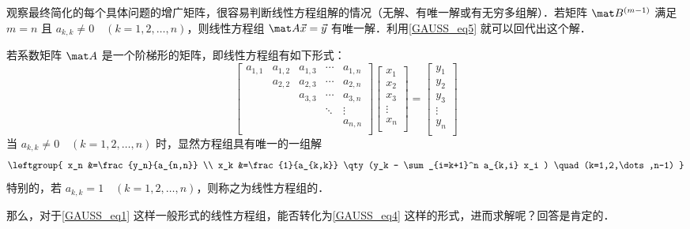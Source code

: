 观察最终简化的每个具体问题的增广矩阵，很容易判断线性方程组解的情况（无解、有唯一解或有无穷多组解）．若矩阵 $\mat B^{(m-1)}$ 满足 $m=n$ 且 $a_{k,k}\neq 0 \quad (k=1,2,\dots,n)$，则线性方程组 $\mat A \vec x = \vec y$ 有唯一解．利用\autoref{GAUSS_eq5} 就可以回代出这个解．





若系数矩阵 $\mat A$ 是一个阶梯形的矩阵，即线性方程组有如下形式：
\begin{equation}\label{GAUSS_eq17}
{
	\left[ \begin{matrix}
	a_{1,1} &a_{1,2} &a_{1,3} &\cdots &a_{1,n} \\
	        &a_{2,2} &a_{2,3} &\cdots &a_{2,n} \\
	        &        &a_{3,3} &\cdots &a_{3,n} \\
             &        &        &\ddots &\vdots  \\
	        &        &        &       &a_{n,n} \\
	\end{matrix} 
	\right ]}
{
	\left[ \begin{matrix}
	x_1 \\
	x_2 \\
     x_3 \\
     \vdots \\
	x_n \\
	\end{matrix} 
	\right ]}=
{
	\left[ \begin{matrix}
	y_1 \\
	y_2 \\
     y_3 \\
     \vdots \\
	y_n \\
	\end{matrix} 
	\right ]}
\end{equation}
当 $a_{k,k}\neq 0 \quad (k=1,2,\dots,n)$ 时，显然方程组具有唯一的一组解
\begin{equation}\label{GAUSS_eq5}
\leftgroup{
x_n &=\frac{y_n}{a_{n,n}} \\
x_k &=\frac{1}{a_{k,k}} \qty(y_k - \sum_{i=k+1}^n a_{k,i} x_i ) \quad (k=1,2,\dots,n-1) }\\
\end{equation}
特别的，若 $a_{k,k} = 1 \quad (k=1,2,\dots,n)$，则称之为线性方程组的．

那么，对于\autoref{GAUSS_eq1} 这样一般形式的线性方程组，能否转化为\autoref{GAUSS_eq4} 这样的形式，进而求解呢？回答是肯定的． %

